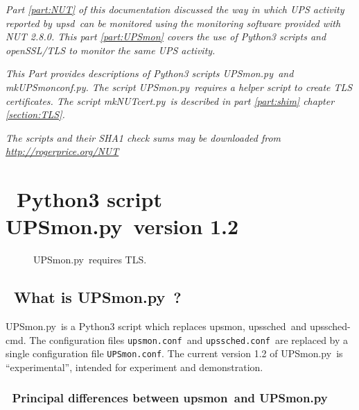 \documentclass[12pt]{article}
\newlength{\headersep}\setlength{\headersep}{3mm}
\newcommand{\Hsep}{\hspace{\headersep}}
\newcommand{\newcolumn}{\vfill\eject}
\newcommand{\upsd}{\mbox{\textcolor{UPSDCOLOUR}{upsd}}}
\newcommand{\upsmon}{\mbox{\textcolor{MONCOLOUR}{upsmon}}}
\newcommand{\upssched}{\mbox{\textcolor{SCHEDCOLOUR}{upssched}}}
\newcommand{\upsschedcmd}{\mbox{\textcolor{CMDCOLOUR}{upssched-cmd}}}
\newcommand{\mkNUTcert}{\mbox{\textcolor{MKNUTCERTCOLOUR}{mkNUTcert.py}}}
\newcommand{\UPSmon}{\mbox{\textcolor{UPSMONCOLOUR}{UPSmon.py}}}
\newcommand{\mkUPSmonconf}{\mbox{\textcolor{UPSMONCOLOUR}{mkUPSmonconf.py}}}
\newcommand{\upsmonconf}{\textcolor{MONCOLOUR}{\texttt{upsmon.conf}}}
\newcommand{\upsschedconf}{\textcolor{SCHEDCOLOUR}{\texttt{upssched.conf}}}
\newcommand{\UPSmonconf}{\textcolor{UPSMONCOLOUR}{\texttt{UPSmon.conf}}}
\begin{document}
\textit{Part \ref{part:NUT} of this documentation discussed the way in
  which UPS activity reported by \upsd\ can be monitored using the
  monitoring software provided with NUT 2.8.0.  This part
  \ref{part:UPSmon} covers the use of Python3 scripts and openSSL/TLS
  to monitor the same UPS activity.}

\textit{This Part provides descriptions of Python3 scripts
  \UPSmon\ and \mkUPSmonconf.  The script \UPSmon\ requires a helper
  script to create TLS certificates. The script \mkNUTcert\ is
  described in part \ref{part:shim} chapter \ref{section:TLS}.}

\textit{The scripts and their SHA1 check sums may be downloaded from
        \href{rogerprice.org/NUT}{http://rogerprice.org/NUT}}

\vspace{10mm}

\section{\Hsep\ Python3 script \UPSmon\ version 1.2}\label{section:Umintro}

\begin{figure}[ht]
\vspace{-6mm}
\begin{center}
\end{center}
\vspace{-6mm}
\caption{\UPSmon\ requires TLS.\label{fig:UPSmon-OB}}
\end{figure}

\subsection{\Hsep\ What is \UPSmon\ ?}\label{section:Umwhat}

\UPSmon\ is a Python3 script which replaces \upsmon, \upssched\ and
\upsschedcmd.  The configuration files \upsmonconf\ and \upsschedconf\ are
replaced by a single configuration file \UPSmonconf.  The current version 1.2
of \UPSmon\ is ``experimental'', intended for experiment and demonstration.

\subsubsection{\Hsep\ Principal differences between \upsmon\ and \UPSmon}\label{section:differences}
\end{document}
